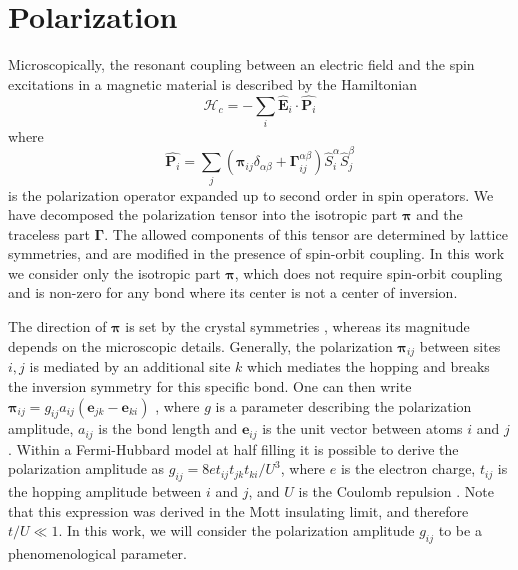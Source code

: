 \documentclass[aps,prb,reprint,twocolumns,superscriptaddress,nofootinbib]{revtex4-2}
\begin{document}
	\section{Polarization}
	\label{sec:polarization}
	Microscopically, the resonant coupling between an electric field and the spin excitations in a magnetic material is described by the Hamiltonian \cite{moriyaTheoryLightScattering1967}
	\begin{equation}
		\mathcal H_c = -\sum_i \hat{\bm E}_i \cdot \hat{\bm P_{i}}
	\end{equation}
	where 
	\begin{equation}
		\hat{\bm P_{i}} = \sum_j\left(\bm\pi_{ij}\delta_{\alpha\beta} +\bm\Gamma_{ij}^{\alpha\beta} \right) \hat S_i^\alpha \hat S_j^\beta
	\end{equation}
	is the polarization operator expanded up to second order in spin operators. 
	We have decomposed the polarization tensor into the isotropic part $\bm \pi$ and the traceless part $\bm \Gamma$. The allowed components of this tensor are determined by lattice symmetries, and are modified in the presence of spin-orbit coupling. 
	In this work we consider only the isotropic part $\bm\pi$, which does not require spin-orbit coupling and is non-zero for any bond where its center is not a center of inversion. 
	
	The direction of $\bm \pi$ is set by the crystal symmetries \cite{seifertOpticalExcitationMagnons2019,bolensTheoryElectronicMagnetoelectric2018},  whereas its magnitude depends on the microscopic details. Generally, the polarization $\bm\pi_{ij}$ between sites $i,j$ is mediated by an additional site $k$ which mediates the hopping and breaks the inversion symmetry for this specific bond. One can then write
	$  \bm \pi_{ij} = g_{ij}a_{ij}(\bm e_{jk} - \bm e_{ki})$ \cite{zhuSpinorbitCouplingElectronic2014}, where $g$ is a parameter describing the polarization amplitude, $a_{ij}$ is the bond length and $\bm e_{ij}$ is the unit vector between atoms $i$ and $j$. Within a Fermi-Hubbard model at half filling it is possible to derive the polarization amplitude as 
	$g_{ij}= 8e t_{ij}t_{jk}t_{ki}/U^3$, where $e$ is the electron charge, $t_{ij}$ is the hopping amplitude between $i$ and $j$, and $U$ is the Coulomb repulsion \cite{zhuSpinorbitCouplingElectronic2014}. Note that this expression was derived in the Mott insulating limit, and therefore $t/U\ll1$. In this work, we will consider the polarization amplitude $g_{ij}$ to be a phenomenological parameter.
	
	
	
\end{document}
